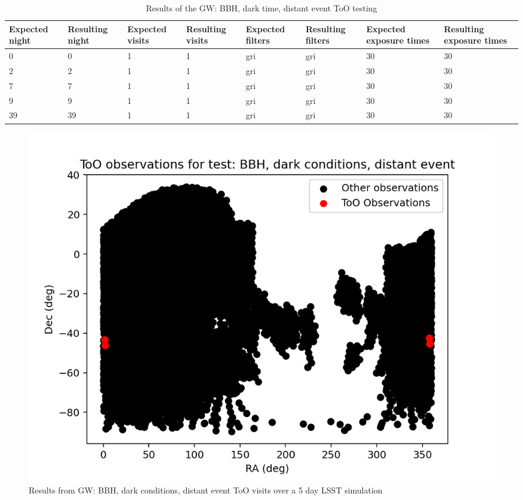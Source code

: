 \begin{table}[h!]
\centering
\begin{adjustbox}{max width=\textwidth}
\begin{tabular}{|l|l|l|l|l|l|l|l|}
\hline
Expected night & Resulting night & Expected visits & Resulting visits & Expected filters & Resulting filters & Expected exposure times & Resulting exposure times \\ \hline
0              & 0               & 1               & 1                & gri              & gri               & 30                      & 30                       \\ \hline
2              & 2               & 1               & 1                & gri              & gri               & 30                      & 30                       \\ \hline
7              & 7               & 1               & 1                & gri              & gri               & 30                      & 30                       \\ \hline
9              & 9               & 1               & 1                & gri              & gri               & 30                      & 30                       \\ \hline
39             & 39              & 1               & 1                & gri              & gri               & 30                      & 30                       \\ \hline
\end{tabular}
\end{adjustbox}
\caption{Results of the GW: BBH, dark time, distant event ToO testing}
\label{tab:GWBBHDarkFarResults}
\end{table}

\begin{figure}[h!]
    \centering
    \includegraphics[width=0.8\linewidth]{figures/validationTests/SVRequired/BBHDarkFarPosition.png}
    \caption{Results from GW: BBH, dark conditions, distant event ToO visits over a 5 day LSST simulation}
    \label{fig:GWBBHDarkFarPositionResult}
\end{figure}


